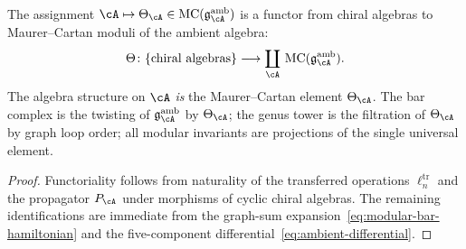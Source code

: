 \begin{proposition}
\label{prop:chriss-ginzburg-structure}
The assignment $\cA \mapsto \Theta_{\cA}
\in \operatorname{MC}(\mathfrak{g}^{\mathrm{amb}}_{\cA})$
is a functor from chiral algebras to Maurer--Cartan moduli of the
ambient algebra:
\begin{equation}
\label{eq:chriss-ginzburg-functor}
\Theta\colon
\{\text{chiral algebras}\}
\longrightarrow
\coprod_{\cA}\,
\operatorname{MC}(\mathfrak{g}^{\mathrm{amb}}_{\cA}).
\end{equation}
The algebra structure on $\cA$ \emph{is} the Maurer--Cartan element
$\Theta_{\cA}$.  The bar complex is the twisting of
$\mathfrak{g}^{\mathrm{amb}}_{\cA}$ by $\Theta_{\cA}$; the genus
tower is the filtration of $\Theta_{\cA}$ by graph loop order; all
modular invariants are projections of the single universal element.
\end{proposition}

\begin{proof}
Functoriality follows from naturality of the transferred operations
$\ell_n^{\mathrm{tr}}$ and the propagator $P_{\cA}$ under morphisms
of cyclic chiral algebras.  The remaining identifications are
immediate from the graph-sum expansion~\eqref{eq:modular-bar-hamiltonian}
and the five-component
differential~\eqref{eq:ambient-differential}.
\end{proof}


